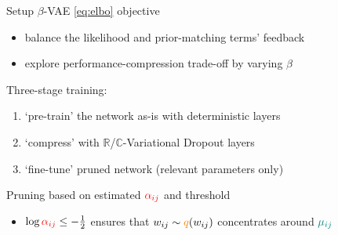 \documentclass{beamer}
\newcommand{\real}{\mathbb{R}}
\newcommand{\cplx}{\mathbb{C}}
\begin{document}
\begin{frame}[c]{Setup}{\insertsection}
  $\beta$-VAE \ref{eq:elbo} objective {\tiny \citep{higgins_beta-vae_2017}}
  \begin{itemize}
    \item balance the likelihood and prior-matching terms' feedback
    \item explore performance-compression trade-off by varying $\beta$
  \end{itemize}

  \bigskip
  Three-stage training:
  \begin{enumerate}
    \item `pre-train' the network as-is with deterministic layers
    \item `compress' with $\real$/$\cplx$-Variational Dropout layers
    \item `fine-tune' pruned network (relevant parameters only)
  \end{enumerate}

  \bigskip
  Pruning based on estimated ${\color{red} \alpha_{ij}}$ and threshold
  \begin{itemize}
    \item $
      \log{{\color{red} \alpha_{ij}}} \leq -\tfrac12
    $ ensures that $
      w_{ij} \sim {\color{orange} q}(w_{ij})
    $ concentrates around ${\color{teal} \mu_{ij}}$
  \end{itemize}
\end{frame}

\end{document}
